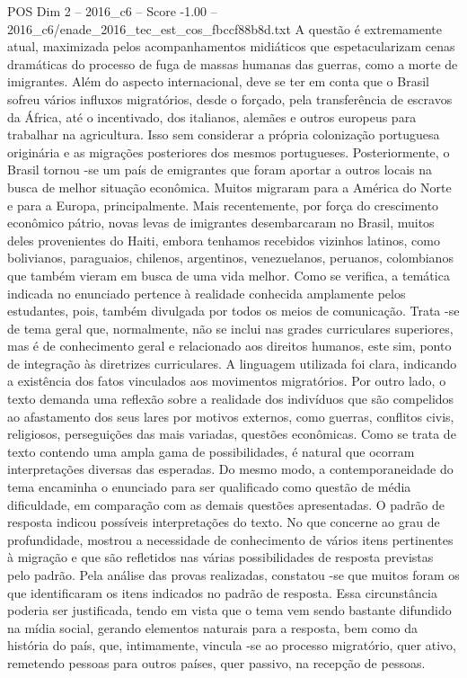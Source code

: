 \begin{textsample}{POS Dim 2 – 2016\_c6 – Score -1.00 – 2016\_c6/enade\_2016\_tec\_est\_cos\_fbccf88b8d.txt}
A questão é extremamente atual, maximizada pelos acompanhamentos midiáticos que espetacularizam cenas dramáticas do processo de fuga de massas humanas das guerras, como a morte de imigrantes.
Além do aspecto internacional, deve se ter em conta que o Brasil sofreu vários influxos migratórios, desde o forçado, pela transferência de escravos da África, até o incentivado, dos italianos, alemães e outros europeus para trabalhar na agricultura.
Isso sem considerar a própria colonização portuguesa originária e as migrações posteriores dos mesmos portugueses.
Posteriormente, o Brasil tornou -se um país de emigrantes que foram aportar a outros locais na busca de melhor situação econômica.
Muitos migraram para a América do Norte e para a Europa, principalmente.
Mais recentemente, por força do crescimento econômico pátrio, novas levas de imigrantes desembarcaram no Brasil, muitos deles provenientes do Haiti, embora tenhamos recebidos vizinhos latinos, como bolivianos, paraguaios, chilenos, argentinos, venezuelanos, peruanos, colombianos que também vieram em busca de uma vida melhor.
Como se verifica, a temática indicada no enunciado pertence à realidade conhecida amplamente pelos estudantes, pois, também divulgada por todos os meios de comunicação.
Trata -se de tema geral que, normalmente, não se inclui nas grades curriculares superiores, mas é de conhecimento geral e relacionado aos direitos humanos, este sim, ponto de integração às diretrizes curriculares.
A linguagem utilizada foi clara, indicando a existência dos fatos vinculados aos movimentos migratórios.
Por outro lado, o texto demanda uma reflexão sobre a realidade dos indivíduos que são compelidos ao afastamento dos seus lares por motivos externos, como guerras, conflitos civis, religiosos, perseguições das mais variadas, questões econômicas.
Como se trata de texto contendo uma ampla gama de possibilidades, é natural que ocorram interpretações diversas das esperadas.
Do mesmo modo, a contemporaneidade do tema encaminha o enunciado para ser qualificado como questão de média dificuldade, em comparação com as demais questões apresentadas.
O padrão de resposta indicou possíveis interpretações do texto.
No que concerne ao grau de profundidade, mostrou a necessidade de conhecimento de vários itens pertinentes à migração e que são refletidos nas várias possibilidades de resposta previstas pelo padrão.
Pela análise das provas realizadas, constatou -se que muitos foram os que identificaram os itens indicados no padrão de resposta.
Essa circunstância poderia ser justificada, tendo em vista que o tema vem sendo bastante difundido na mídia social, gerando elementos naturais para a resposta, bem como da história do país, que, intimamente, vincula -se ao processo migratório, quer ativo, remetendo pessoas para outros países, quer passivo, na recepção de pessoas.

\end{textsample}
